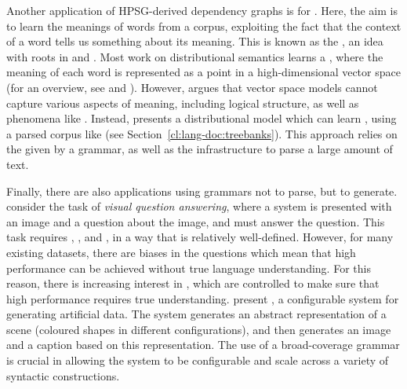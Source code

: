 \documentclass[output=paper,nonflat]{langsci/langscibook}
\begin{document}
Another application of HPSG-derived dependency graphs
is for \textit{}.
Here, the aim is to learn the meanings of words from a corpus,
exploiting the fact that the context of a word tells us something about its meaning.
This is known as the \textit{},
an idea with roots in  \citep{harris1954distribution}
and  \citep{firth1951collocation,firth1957company}.
Most work on distributional semantics learns a \textit{},
where the meaning of each word is represented as a point in a high-dimensional vector space
(for an overview, see \citealt{erk2012vector} and \citealt{clark2015vector}).
However, \citet{emerson2018functional} argues that
vector space models cannot capture various aspects of meaning,
including logical structure, as well as phenomena like .
Instead, \citeauthor{emerson2018functional} presents a distributional model
which can learn ,
using a parsed corpus like  (see Section~\ref{cl:lang-doc:treebanks}).
This approach relies on the  given by a grammar,
as well as the infrastructure to parse a large amount of text.

Finally, there are also applications using grammars not to parse,
but to generate.
\citet{kuhnle2018shapeworld} consider the task of \textit{visual question answering},
where a system is presented with an image and a question about the image,
and must answer the question.
This task requires , , and ,
in a way that is relatively well-defined.
However, for many existing datasets, there are biases in the questions
which mean that high performance can be achieved without true language understanding.
For this reason, there is increasing interest in ,
which are controlled to make sure that high performance requires true understanding.
\citeauthor{kuhnle2018shapeworld} present ,
a configurable system for generating artificial data.
The system generates an abstract representation of a scene
(coloured shapes in different configurations),
and then generates an image and a caption based on this representation.
The use of a broad-coverage grammar is crucial
in allowing the system to be configurable
and scale across a variety of syntactic constructions.%
%
\end{document}

